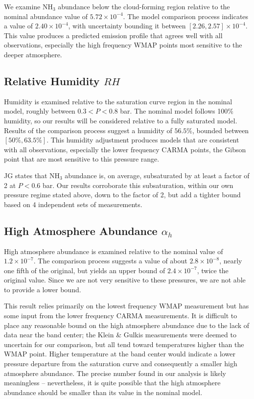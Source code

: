 \documentclass{article}
\newcommand{\e}[1]{\times 10^{#1}}
\begin{document}
	We examine NH$_{3}$ abundance below the cloud-forming region relative to the nominal abundance value of $5.72\e{-4}$.
	The model comparison process indicates a value of $2.40\e{-4}$, with uncertainty bounding it between $[2.26, 2.57] \e{-4}$.
	This value produces a predicted emission profile that agrees well with all observations, especially the high frequency WMAP points most sensitive to the deeper atmosphere.

\subsection{Relative Humidity $RH$}

	Humidity is examined relative to the saturation curve region in the nominal model, roughly between $0.3 < P < 0.8$ bar.
	The nominal model follows 100\% humidity, so our results will be considered relative to a fully saturated model.
	Results of the comparison process suggest a humidity of $56.5\%$, bounded between $[50\%, 63.5\%]$.
	This humidity adjustment produces models that are consistent with all observations, especially the lower frequency CARMA points, the Gibson point that are most sensitive to this pressure range.

	JG states that NH$_{3}$ abundance is, on average, subsaturated by at least a factor of 2 at $P < 0.6$ bar.
	Our results corroborate this subsaturation, within our own pressure regime stated above, down to the factor of 2, but add a tighter bound based on 4 independent sets of measurements.


\subsection{High Atmosphere Abundance $\alpha_{h}$}

	High atmosphere abundance is examined relative to the nominal value of $1.2\e{-7}$.
	The comparison process suggests a value of about $2.8\e{-8}$, nearly one fifth of the original, but yields an upper bound of $2.4\e{-7}$, twice the original value.
	Since we are not very sensitive to these pressures, we are not able to provide a lower bound.

	This result relies primarily on the lowest frequency WMAP measurement but has some input from the lower frequency CARMA measurements.
	It is difficult to place any reasonable bound on the high atmosphere abundance due to the lack of data near the band center; the Klein \& Gulkis measurements were deemed to uncertain for our comparison, but all tend toward temperatures higher than the WMAP point.
	Higher temperature at the band center would indicate a lower pressure departure from the saturation curve and consequently a smaller high atmosphere abundance.
	The precise number found in our analysis is likely meaningless -- nevertheless, it is quite possible that the high atmosphere abundance should be smaller than its value in the nominal model.
\end{document}
